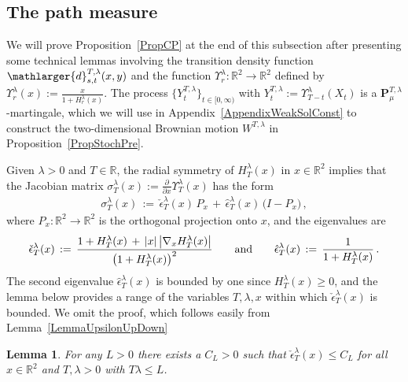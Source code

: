 \documentclass[10pt]{article}
\numberwithin{equation}{section}
\newtheorem{lemma}[theorem]{Lemma}
\theoremstyle{definition}
\newcommand{\R}{{\mathbb R}}
\newcommand{\Rphi}{{\Upsilon}}
\begin{document}
\begin{appendix}
\section{The path measure} \label{AppendixYMart}
We will prove Proposition~\ref{PropCP} at the end of this subsection after presenting some technical lemmas involving the transition density function $\mathlarger{d}_{s,t}^{T,\lambda}(x,y) $ and the function $\Rphi_{r}^{\lambda}:\R^2\rightarrow \R^2$ defined by $\Rphi_{r}^{\lambda}(x):=\frac{x}{1+H_{r}^{\lambda}(x)  }$.  The process $\{Y_t^{T,\lambda}\}_{t\in [0,\infty)}$ with $Y_t^{T,\lambda}:=\Rphi_{T-t}^{\lambda}(X_t)$ is a $\mathbf{P}^{T,\lambda}_{\mu}$-martingale, which we will use in Appendix~\ref{AppendixWeakSolConst} to construct the two-dimensional Brownian motion $W^{T,\lambda}$ in Proposition~\ref{PropStochPre}.



Given $  \lambda > 0$ and $T \in \R$, the radial  symmetry of  $H_{T}^{\lambda}(x)$  in $x\in \R^2$ implies that the  Jacobian matrix $\sigma_{T}^{\lambda}(x):=\frac{\partial}{\partial x}\Rphi_{T}^{\lambda}(x)$ has the form
\begin{align*}
\sigma_{T}^{\lambda}(x)\,:=\, \check{\epsilon}_{T}^{\lambda}(x)\,P_x \,+\,\hat{\epsilon}_{T}^{\lambda}(x)\,\big(I-P_x\big)  \,,
\end{align*}
where $P_x:\R^2\rightarrow \R^2$ is the orthogonal projection  onto  $x$, and the eigenvalues are
\begin{align}\label{SigmaForm}
\check{\epsilon}_{T}^{\lambda}(x)\,:=\,\frac{1+H_{T}^{\lambda}(x)\,+\,|x|\,\big|\nabla_x H_{T}^{\lambda}(x)\big|}{\big(1+H_{T}^{\lambda}(x)\big)^2  } \hspace{.7cm}\text{and}\hspace{.7cm} \hat{\epsilon}_{T}^{\lambda}(x)\,:=\,\frac{1}{1+H_{T}^{\lambda}(x)  }\,. \end{align} 
The second eigenvalue $\hat{\epsilon}_{T}^{\lambda}(x)$ is bounded by one since $H_{T}^{\lambda}(x)\geq 0$, and the lemma below provides a range of the variables $T,\lambda,x$ within which $\check{\epsilon}_{T}^{\lambda}(x)$ is bounded.  We omit the proof, which follows easily from Lemma~\ref{LemmaUpsilonUpDown}
\begin{lemma}\label{LemmaSpecialUpperBounds}  For any $L>0$ there exists a $C_L>0$ such that $\check{\epsilon}_{T}^{\lambda}(x) \leq C_L$   for all $x\in \R^2$ and $T,\lambda>0$ with $T\lambda\leq L$.
\end{lemma}




\end{appendix}
\end{document}
